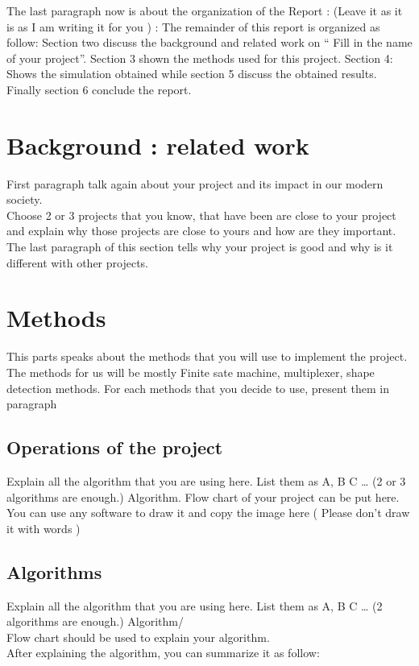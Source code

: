 \documentclass[10pt,sigconf, review]{article}
\begin{document}
The last paragraph now is about the organization of the Report :  (Leave it as
it is as I am writing it for you ) : The remainder of this report is organized
as follow: Section two discuss the background and related work on “ Fill in the
name of your project”. Section 3 shown the methods used for this project.
Section 4: Shows the simulation obtained while section 5 discuss the obtained
results. Finally section 6 conclude the report.


\section{Background : related work}

First paragraph talk again about your project and its impact in our modern society.\\

Choose 2 or 3 projects that you know, that have been are close to your project
and explain why those projects are close to yours and how are they important.\\ 

The last paragraph of this section tells why your project is good and why is it
different with other projects.\\

\section{Methods}

This parts speaks about the methods that you will use to implement the project.
The methods for us will be mostly Finite sate machine, multiplexer, shape
detection methods. For each methods that you decide to use, present them in
paragraph

\subsection{Operations of the project}

Explain all the algorithm that you are using here. List them as A, B C … (2 or
3 algorithms are enough.) Algorithm. Flow chart of your project can be put
here. You can use any software to draw it and copy the image here ( Please
don’t draw it with words )


\subsection{Algorithms}
Explain all the algorithm that you are using here. List them as A, B C … (2
algorithms are enough.) Algorithm/\\
Flow chart should be used to explain your algorithm.\\
After explaining the algorithm, you can summarize it as follow:\\
\end{document}

